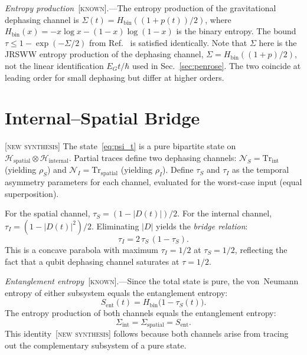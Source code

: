 \documentclass[prl,twocolumn,superscriptaddress,longbibliography,floatfix]{revtex4-2}
\newcommand{\Tr}{\mathrm{Tr}}
\newcommand{\chan}{\mathcal{N}}
\newcommand{\hilb}{\mathcal{H}}
\newcommand{\tauasym}{\tau}
\begin{document}
\emph{Entropy production}~[\textsc{known}].---The entropy production
of the gravitational dephasing channel is
$\Sigma(t) = H_{\mathrm{bin}}((1+p(t))/2)$, where
$H_{\mathrm{bin}}(x) = -x\log x - (1-x)\log(1-x)$ is the binary
entropy.  The bound~$\tauasym \leq 1 - \exp(-\Sigma/2)$
from Ref.~\cite{Paper1} is satisfied identically.
Note that $\Sigma$ here is the JRSWW entropy production of the
dephasing channel, $\Sigma = H_{\mathrm{bin}}((1+p)/2)$, not the
linear identification $E_G t/\hbar$ used in
Sec.~\ref{sec:penrose}.  The two coincide at leading order for small
dephasing but differ at higher orders.

\section{Internal--Spatial Bridge}
\label{sec:bridge}

[\textsc{new synthesis}]  The state~\eqref{eq:psi_t} is a pure
bipartite state on $\hilb_{\mathrm{spatial}} \otimes
\hilb_{\mathrm{internal}}$.  Partial traces define two dephasing
channels: $\chan_S = \Tr_{\mathrm{int}}$ (yielding $\rho_S$) and
$\chan_I = \Tr_{\mathrm{spatial}}$ (yielding $\rho_I$).  Define
$\tauasym_S$ and $\tauasym_I$ as the temporal asymmetry parameters for
each channel, evaluated for the worst-case input (equal
superposition).

For the spatial channel, $\tauasym_S = (1 - |D(t)|)/2$.  For the
internal channel, $\tauasym_I = (1 - |D(t)|^2)/2$.  Eliminating
$|D|$ yields the \emph{bridge relation}:
\begin{equation}
\boxed{
\tauasym_I = 2\,\tauasym_S\,(1 - \tauasym_S).
}
\label{eq:bridge}
\end{equation}
This is a concave parabola with maximum $\tauasym_I = 1/2$
at $\tauasym_S = 1/2$, reflecting the fact that a qubit
dephasing channel saturates at $\tauasym = 1/2$.

\emph{Entanglement entropy}~[\textsc{known}].---Since the total state
is pure, the von~Neumann entropy of either subsystem equals the
entanglement entropy:
\begin{equation}
S_{\mathrm{ent}}(t) = H_{\mathrm{bin}}\!\big(1 - \tauasym_S(t)\big).
\label{eq:S_ent}
\end{equation}
The entropy production of both channels equals the entanglement
entropy:
\begin{equation}
\Sigma_{\mathrm{int}} = \Sigma_{\mathrm{spatial}}
= S_{\mathrm{ent}}.
\label{eq:sigma_ent}
\end{equation}
This identity~[\textsc{new synthesis}] follows because both channels
arise from tracing out the complementary subsystem of a pure state.
\end{document}
